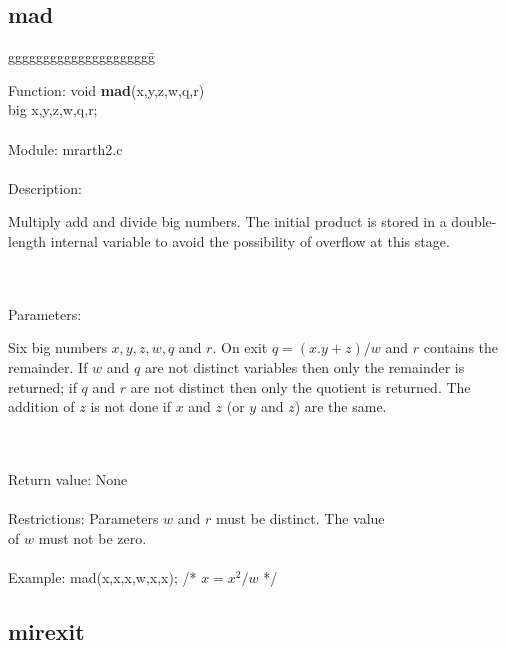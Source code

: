 \subsection{mad}

\begin{tabbing}
ggggggggggggggggggggg\= \kill


      Function:      \>void {\bf mad}(x,y,z,w,q,r) \\
                     \>big x,y,z,w,q,r; \\
      \ \\
      Module:        \>mrarth2.c \\
      \ \\
      Description:   \>
                     \parbox[t]{3in}
                     {Multiply add and divide big numbers. The initial product
                     is stored in a double-length internal variable to avoid
                     the possibility of overflow at this stage.} \\
      \ \\
      Parameters:    \>
                     \parbox[t]{3in}
                     {Six big numbers $x,y,z,w,q$ and $r$. On exit $q=(x.y+z)/w$ and
                     $r$ contains the remainder. If $w$ and $q$ are not distinct
                     variables then only the remainder is returned; if $q$ and $r$
                     are not distinct then only the quotient is returned. The
                     addition of $z$ is not done if $x$ and $z$ (or $y$ and $z$) are the
                     same.} \\
      \ \\
      Return value:  \>None \\
      \ \\
      Restrictions:  \>Parameters $w$ and $r$ must be distinct. The value  \\
                     \>of $w$ must not be zero. \\
      \ \\
      Example:       \>mad(x,x,x,w,x,x); /* $x=x^2/w$ */
\end{tabbing}

\subsection{mirexit}

